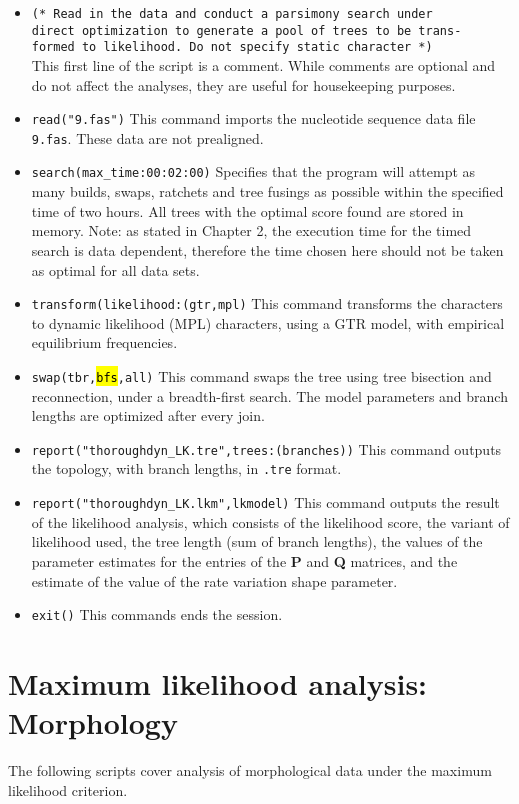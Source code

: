 \begin{itemize}
\item \texttt{(* Read in the data and conduct a parsimony search under \\direct optimization to generate a pool of trees 
to be trans- \\formed to likelihood.  Do not specify static character *)} \\This first line of the script is a comment. While 
comments are optional and do not affect the analyses, they are useful for housekeeping purposes.
\item \texttt{read("9.fas")} This command imports the nucleotide sequence data file \texttt{9.fas}. These data are 
not prealigned. 
\item \texttt{search(max\_time:00:02:00)} Specifies that the program will attempt as many builds, swaps, ratchets 
and tree fusings as possible within the specified time of two hours. All trees with the optimal score found are stored 
in memory.  Note: as stated in Chapter 2, the execution time for the timed search is data dependent, 
therefore the time chosen here should not be taken as optimal for all data sets.
\item \texttt{transform(likelihood:(gtr,mpl)} This command transforms the characters to dynamic likelihood (MPL) 
characters, using a GTR model, with empirical equilibrium frequencies.
\item \texttt{swap(tbr,\hl{bfs},all)} This command swaps the tree using tree bisection and reconnection, under a breadth-first 
search. The model parameters and branch lengths are optimized after every join.
\item \texttt{report("thoroughdyn\_LK.tre",trees:(branches))} This command outputs the topology, with branch lengths, in 
\texttt{.tre} format.
\item \texttt{report("thoroughdyn\_LK.lkm",lkmodel)} This command outputs the result of the likelihood analysis, which 
consists of the likelihood score, the variant of likelihood used, the tree length (sum of branch lengths), the values 
of the parameter estimates for the entries of the \textbf{P} and \textbf{Q} matrices, and the estimate of the value of 
the rate variation shape parameter.
\item \texttt{exit()} This commands ends the \poy session.
\end{itemize}

\section{Maximum likelihood analysis: Morphology}{\label{tutorial 12}}
The following scripts cover analysis of morphological data under the maximum likelihood criterion. %

